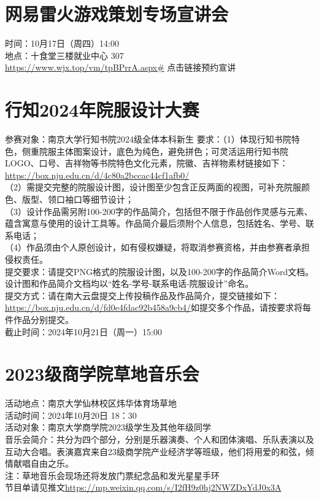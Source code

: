 \documentclass[letterpaper, 12pt]{article}
\begin{document}
\begin{multicols}{2}
\section{网易雷火游戏策划专场宣讲会}
 时间：10月17日（周四）14:00\\
 地点：十食堂三楼就业中心 307\\
\url{https://www.wjx.top/vm/tpBPrrA.aspx#} 点击链接预约宣讲

\section{行知2024年院服设计大赛}
参赛对象：南京大学行知书院2024级全体本科新生
要求：（1）体现行知书院特色，侧重院服主体图案设计，底色为纯色，避免拼色；可灵活运用行知书院LOGO、口号、吉祥物等书院特色文化元素，院徽、吉祥物素材链接如下：\url{https://box.nju.edu.cn/d/4c80a2bccac44cf1afb0/}\\
（2）需提交完整的院服设计图，设计图至少包含正反两面的视图，可补充院服颜色、版型、领口袖口等细节设计；\\
（3）设计作品需另附100-200字的作品简介，包括但不限于作品创作灵感与元素、蕴含寓意与使用的设计工具等。作品简介最后须附个人信息，包括姓名、学号、联系电话；\\
（4）作品须由个人原创设计，如有侵权嫌疑，将取消参赛资格，并由参赛者承担侵权责任。\\
提交要求：请提交PNG格式的院服设计图，以及100-200字的作品简介Word文档。
设计图和作品简介文档均以“姓名-学号-联系电话-院服设计”命名。\\
提交方式：请在南大云盘提交上传投稿作品及作品简介，提交链接如下：\url{https://box.nju.edu.cn/d/fd0e4fdac92b458a9cb4/}如提交多个作品，请按要求将每件作品分别提交。\\
截止时间：2024年10月21日（周一）15:00

\section{2023级商学院草地音乐会}
活动地点：南京大学仙林校区炜华体育场草地\\
活动时间：2024年10月20日 18：30\\
活动对象：南京大学商学院2023级学生及其他年级同学\\
音乐会简介：共分为四个部分，分别是乐器演奏、个人和团体演唱、乐队表演以及互动大合唱。表演嘉宾来自23级商学院产业经济学等班级，他们将用爱的和弦，倾情献唱自由之乐。\\
注：草地音乐会现场还将发放门票纪念品和发光星星手环\\
节目单请见推文\url{https://mp.weixin.qq.com/s/I2fH9z0hj2NWZDxYdJ0x3A}\\


\end{multicols}
\end{document}
